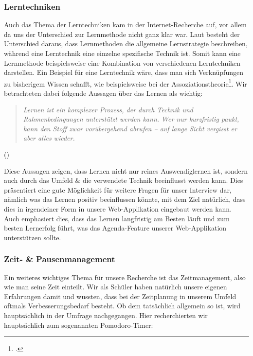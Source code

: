 \documentclass[12pt,a4paper]{report}
\begin{document}
\subsubsection{Lerntechniken}
Auch das Thema der Lerntechniken kam in der Internet-Recherche auf, vor allem da uns der Unterschied zur Lernmethode nicht ganz klar war. 
Laut \textcite{Lerntechnik_1} besteht der Unterschied daraus, dass Lernmethoden die allgemeine Lernstrategie beschreiben, während eine Lerntechnik eine einzelne spezifische Technik ist.
Somit kann eine Lernmethode beispielsweise eine Kombination von verschiedenen Lerntechniken darstellen. 
Ein Beispiel für eine Lerntechnik wäre, dass man sich Verknüpfungen zu bisherigem Wissen schafft, wie beispielsweise bei der Assoziationstheorie\footcite{Book2}.
Wir betrachteten dabei folgende Aussagen über das Lernen als wichtig: \begin{quote}
    \textit{Lernen ist ein komplexer Prozess, der durch Technik und Rahmenbedingungen unterstützt werden kann.\newline
Wer nur kurzfristig paukt, kann den Stoff zwar vorübergehend abrufen – auf lange Sicht vergisst er aber alles wieder.}
\end{quote}
(\textcite{Lerntechnik_2})\newline

Diese Aussagen zeigen, dass Lernen nicht nur reines Auswendiglernen ist, sondern auch durch das Umfeld \& die verwendete Technik beeinflusst werden kann.
Dies präsentiert eine gute Möglichkeit für weitere Fragen für unser Interview dar, nämlich was das Lernen positiv beeinflussen könnte, mit dem Ziel natürlich, dass dies in irgendeiner Form in unsere Web-Applikation eingebaut werden kann.
Auch emphasiert dies, dass das Lernen langfristig am Besten läuft und zum besten Lernerfolg führt, was das Agenda-Feature unserer Web-Applikation unterstützen sollte.

\subsubsection{Zeit- \& Pausenmanagement}
Ein weiteres wichtiges Thema für unsere Recherche ist das Zeitmanagement, also wie man seine Zeit einteilt. 
Wir als Schüler haben natürlich unsere eigenen Erfahrungen damit und wussten, dass bei der Zeitplanung in unserem Umfeld oftmals Verbesserungsbedarf besteht. 
Ob dem tatsächlich allgemein so ist, wird hauptsächlich in der Umfrage nachgegangen. Hier recherchierten wir hauptsächlich zum sogenannten Pomodoro-Timer:
\end{document}
